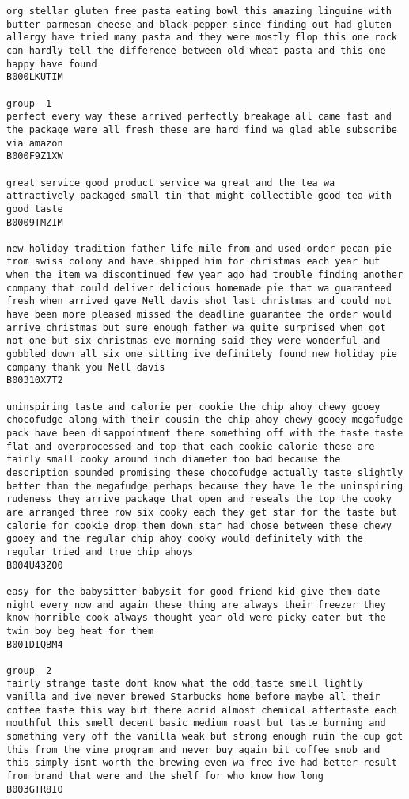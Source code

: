 \documentclass[11pt]{article}
\begin{document}
\begin{Verbatim}[commandchars=\\\{\}]
org stellar gluten free pasta eating bowl this amazing linguine with butter parmesan cheese and black pepper since finding out had gluten allergy have tried many pasta and they were mostly flop this one rock can hardly tell the difference between old wheat pasta and this one happy have found
B000LKUTIM

group  1
perfect every way these arrived perfectly breakage all came fast and the package were all fresh these are hard find wa glad able subscribe via amazon
B000F9Z1XW

great service good product service wa great and the tea wa attractively packaged small tin that might collectible good tea with good taste
B0009TMZIM

new holiday tradition father life mile from and used order pecan pie from swiss colony and have shipped him for christmas each year but when the item wa discontinued few year ago had trouble finding another company that could deliver delicious homemade pie that wa guaranteed fresh when arrived gave Nell davis shot last christmas and could not have been more pleased missed the deadline guarantee the order would arrive christmas but sure enough father wa quite surprised when got not one but six christmas eve morning said they were wonderful and gobbled down all six one sitting ive definitely found new holiday pie company thank you Nell davis
B00310X7T2

uninspiring taste and calorie per cookie the chip ahoy chewy gooey chocofudge along with their cousin the chip ahoy chewy gooey megafudge pack have been disappointment there something off with the taste taste flat and overprocessed and top that each cookie calorie these are fairly small cooky around inch diameter too bad because the description sounded promising these chocofudge actually taste slightly better than the megafudge perhaps because they have le the uninspiring rudeness they arrive package that open and reseals the top the cooky are arranged three row six cooky each they get star for the taste but calorie for cookie drop them down star had chose between these chewy gooey and the regular chip ahoy cooky would definitely with the regular tried and true chip ahoys
B004U43ZO0

easy for the babysitter babysit for good friend kid give them date night every now and again these thing are always their freezer they know horrible cook always thought year old were picky eater but the twin boy beg heat for them
B001DIQBM4

group  2
fairly strange taste dont know what the odd taste smell lightly vanilla and ive never brewed Starbucks home before maybe all their coffee taste this way but there acrid almost chemical aftertaste each mouthful this smell decent basic medium roast but taste burning and something very off the vanilla weak but strong enough ruin the cup got this from the vine program and never buy again bit coffee snob and this simply isnt worth the brewing even wa free ive had better result from brand that were and the shelf for who know how long
B003GTR8IO


\end{Verbatim}
\end{document}
